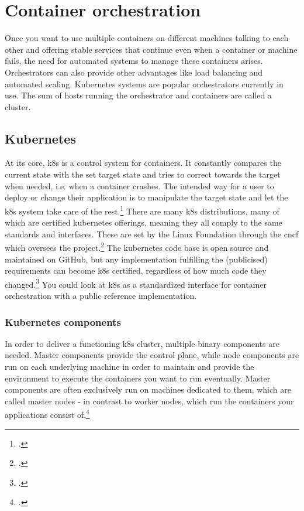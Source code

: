 
\section{Container orchestration}
Once you want to use multiple containers on different machines talking to each other and offering stable services that continue even when a container or machine fails, the need for automated systems to manage these containers arises. Orchestrators can also provide other advantages like load balancing and automated scaling.
Kubernetes systems are popular orchestrators currently in use.
The sum of hosts running the orchestrator and containers are called a cluster.


\subsection{Kubernetes}
At its core, \gls{k8s} is a control system for containers.
It constantly compares the current state with the set target state and tries to correct towards the target when needed, i.e. when a container crashes.
The intended way for a user to deploy or change their application is to manipulate the target state and let the \gls{k8s} system take care of the rest.\footcite{k8sBasics}
There are many \gls{k8s} distributions, many of which are certified kubernetes offerings, meaning they all comply to the same standards and interfaces. These are set by the Linux Foundation through the \gls{cncf} which oversees the project.\footcite{certifiedK8s}
The kubernetes code base is open source and maintained on GitHub, but any implementation fulfilling the (publicised) requirements can become \gls{k8s} certified, regardless of how much code they changed.\footcite{cncf} You could look at \gls{k8s} as a standardized interface for container orchestration with a public reference implementation.

\subsubsection{Kubernetes components}

In order to deliver a functioning \gls{k8s} cluster, multiple binary components are needed.
Master components provide the control plane, while node components are run on each underlying machine in order to maintain and provide the environment to execute the containers you want to run eventually.
Master components are often exclusively run on machines dedicated to them, which are called master nodes - in contrast to worker nodes, which run the containers your applications consist of.\footcite{k8sComponents}

